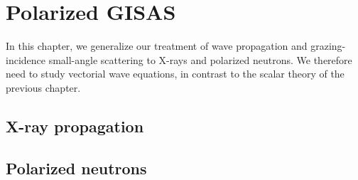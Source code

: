 
\chapter{Polarized GISAS}  \label{sec:polTheory}

In this chapter,
we generalize our treatment of wave propagation and
grazing-incidence small-angle scattering
to X-rays and polarized neutrons.
We therefore need to study vectorial wave equations,
in contrast to the scalar theory of the previous chapter.

\section{X-ray propagation}\label{Sxray}

\MissingSection


\section{Polarized neutrons}\label{Snpol}


\MissingSection

